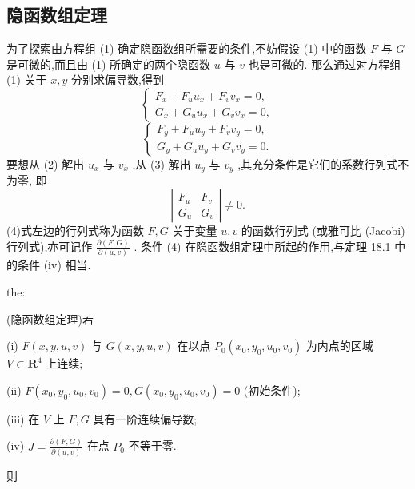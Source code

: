 \subsection{隐函数组定理}

为了探索由方程组 (1) 确定隐函数组所需要的条件,不妨假设 (1) 中的函数 \(F\) 与 \(G\) 是可微的,而且由 (1) 所确定的两个隐函数 \(u\) 与 \(v\) 也是可微的. 那么通过对方程组 (1) 关于 \(x,y\) 分别求偏导数,得到
\[
\left\{  \begin{array}{l} {F}_{x} + {F}_{u}{u}_{x} + {F}_{v}{v}_{x} = 0, \\  {G}_{x} + {G}_{u}{u}_{x} + {G}_{v}{v}_{x} = 0, \end{array}\right.  \tag{2}
\]
\[
\left\{  \begin{array}{l} {F}_{y} + {F}_{u}{u}_{y} + {F}_{v}{v}_{y} = 0, \\  {G}_{y} + {G}_{u}{u}_{y} + {G}_{v}{v}_{y} = 0. \end{array}\right.  \tag{3}
\]
要想从 (2) 解出 \({u}_{x}\) 与 \({v}_{x}\) ,从 (3) 解出 \({u}_{y}\) 与 \({v}_{y}\) ,其充分条件是它们的系数行列式不为零, 即
\[
\left| \begin{array}{ll} {F}_{u} & {F}_{v} \\  {G}_{u} & {G}_{v} \end{array}\right|  \neq  0. \tag{4}
\]
(4)式左边的行列式称为函数 \(F,G\) 关于变量 \(u,v\) 的函数行列式 (或雅可比 (Jacobi) 行列式),亦可记作 \(\frac{\partial \left( {F,G}\right) }{\partial \left( {u,v}\right) }\) . 条件 (4) 在隐函数组定理中所起的作用,与定理 18.1 中的条件 (iv) 相当.

\begin{theorem}{}{the:}

\end{theorem}
(隐函数组定理)若

(i) \(F\left( {x,y,u,v}\right)\) 与 \(G\left( {x,y,u,v}\right)\) 在以点 \({P}_{0}\left( {{x}_{0},{y}_{0},{u}_{0},{v}_{0}}\right)\) 为内点的区域 \(V \subset  {\mathbf{R}}^{4}\) 上连续;

(ii) \(F\left( {{x}_{0},{y}_{0},{u}_{0},{v}_{0}}\right)  = 0,G\left( {{x}_{0},{y}_{0},{u}_{0},{v}_{0}}\right)  = 0\) (初始条件);

(iii) 在 \(V\) 上 \(F,G\) 具有一阶连续偏导数;

(iv) \(J = \frac{\partial \left( {F,G}\right) }{\partial \left( {u,v}\right) }\) 在点 \({P}_{0}\) 不等于零.

则

